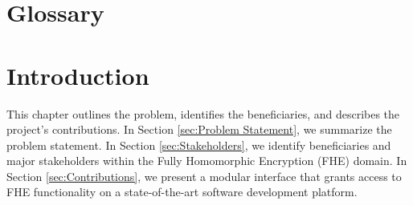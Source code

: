 \documentclass [11pt, proquest] {uwthesis}[2020/02/24]
\begin{document}
 
%
%

\prelimpages
 
%
%


\copyrightpage

\titlepage  

 
%
%

%
%


\setcounter{page}{-1}

 
%
%
\tableofcontents
\listoffigures
\listoftables
 
%
%
\chapter*{Glossary}      %
\thispagestyle{plain}
%

 
%
%

%

%
%

\textpages
 
 
\chapter {Introduction}

This chapter outlines the problem, identifies the beneficiaries, and describes the project's contributions. In Section \ref{sec:Problem Statement}, we summarize the problem statement. In Section \ref{sec:Stakeholders}, we identify beneficiaries and major stakeholders within the Fully Homomorphic Encryption (FHE) domain. In Section \ref{sec:Contributions}, we present a modular interface that grants access to FHE functionality on a state-of-the-art software development platform.
\end{document}
